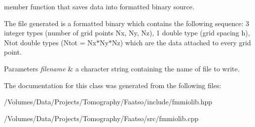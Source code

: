 member function that saves data into formatted binary source. 

The file generated is a formatted binary which contains the following sequence\+: 3 integer types (number of grid points Nx, Ny, Nz), 1 double type (grid spacing h), Ntot double types (Ntot = Nx$\ast$\+Ny$\ast$\+Nz) which are the data attached to every grid point.


\begin{DoxyParams}{Parameters}
{\em filename} & a character string containing the name of file to write. \\
\hline
\end{DoxyParams}


The documentation for this class was generated from the following files\+:\begin{DoxyCompactItemize}
\item 
/\+Volumes/\+Data/\+Projects/\+Tomography/\+Faatso/include/fmmiolib.\+hpp\item 
/\+Volumes/\+Data/\+Projects/\+Tomography/\+Faatso/src/fmmiolib.\+cpp\end{DoxyCompactItemize}
